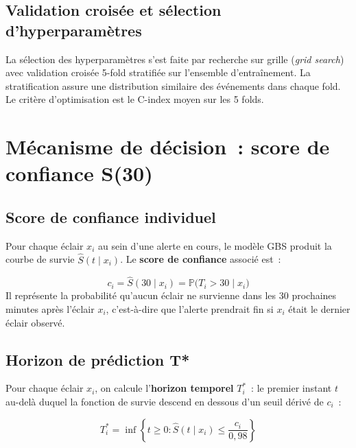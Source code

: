 \documentclass[a4paper,11pt]{article}
\newcommand{\Prob}{\mathbb{P}}
\newcommand{\Ssurvival}{S}
\begin{document}
\subsection{Validation croisée et sélection d'hyperparamètres}

La sélection des hyperparamètres s'est faite par recherche sur grille (\emph{grid search}) avec
validation croisée 5-fold stratifiée sur l'ensemble d'entraînement. La stratification assure une
distribution similaire des événements dans chaque fold. Le critère d'optimisation est le
C-index moyen sur les 5 folds.

\section{Mécanisme de décision~: score de confiance S(30)}
\label{sec:decision}

\subsection{Score de confiance individuel}

Pour chaque éclair $x_i$ au sein d'une alerte en cours, le modèle GBS produit la courbe de
survie $\hat{\Ssurvival}(t \mid x_i)$. Le \textbf{score de confiance} associé est~:

\begin{tcolorbox}[defstyle, title={Score de confiance S(30)}]
\begin{equation}
  c_i = \hat{\Ssurvival}(30 \mid x_i) = \Prob\!\bigl(T_i > 30 \mid x_i\bigr)
  \label{eq:score}
\end{equation}
Il représente la probabilité qu'aucun éclair ne survienne dans les 30 prochaines minutes
après l'éclair $x_i$, c'est-à-dire que l'alerte prendrait fin si $x_i$ était le dernier
éclair observé.
\end{tcolorbox}

\subsection{Horizon de prédiction T*}

Pour chaque éclair $x_i$, on calcule l'\textbf{horizon temporel} $T^*_i$~: le premier instant
$t$ au-delà duquel la fonction de survie descend en dessous d'un seuil dérivé de $c_i$~:

\begin{equation}
  T^*_i = \inf\!\left\{t \geq 0 : \hat{\Ssurvival}(t \mid x_i) \leq \frac{c_i}{0{,}98}\right\}
  \label{eq:horizon}
\end{equation}
\end{document}
